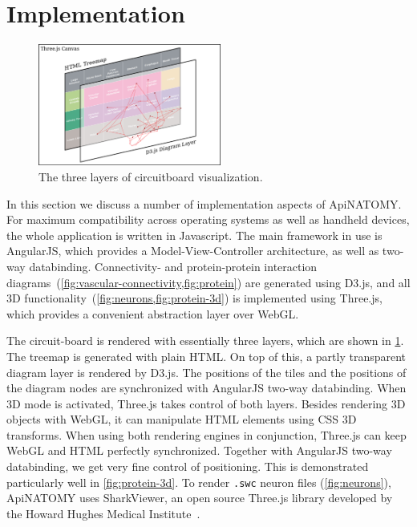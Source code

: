 \section{Implementation} \label{sect:implementation}                                     %

\begin{figure}
	\centering
	\includegraphics[width=6cm]{images/visual-layers.png}
	\caption{The three layers of circuitboard visualization.}
	\label{fig:visual-layers}
\end{figure}

In this section we discuss a number of implementation aspects of \mbox{ApiNATOMY}.
For maximum compatibility across operating systems as well as handheld devices,
the whole application is written in Javascript. The main framework in use is
AngularJS, which provides a Model-View-Controller architecture, as well as
two-way databinding. Connectivity- and protein-protein
interaction diagrams~(\cref{fig:vascular-connectivity,fig:protein})
are generated using D3.js, and all 3D functionality~(\cref{fig:neurons,fig:protein-3d})
is implemented using Three.js, which provides a convenient abstraction layer over WebGL.




The circuit-board is rendered with essentially three layers,
which are shown in \cref{fig:visual-layers}. The treemap is generated
with plain HTML. On top of this, a partly transparent diagram layer is
rendered by D3.js. The positions of the tiles and the positions of the
diagram nodes are synchronized with AngularJS two-way databinding.
When 3D mode is activated, Three.js takes control of both layers.
Besides rendering 3D objects with WebGL, it can manipulate HTML
elements using CSS 3D transforms. When using both rendering engines
in conjunction, Three.js can keep WebGL and HTML perfectly synchronized.
Together with AngularJS two-way databinding, we get very fine control
of positioning. This is demonstrated particularly well in \cref{fig:protein-3d}.
To render \texttt{.swc} neuron files (\cref{fig:neurons}), ApiNATOMY uses SharkViewer,
an open source Three.js library
developed by the Howard Hughes Medical Institute~\cite{weaver_sharkviewer_2014}.

